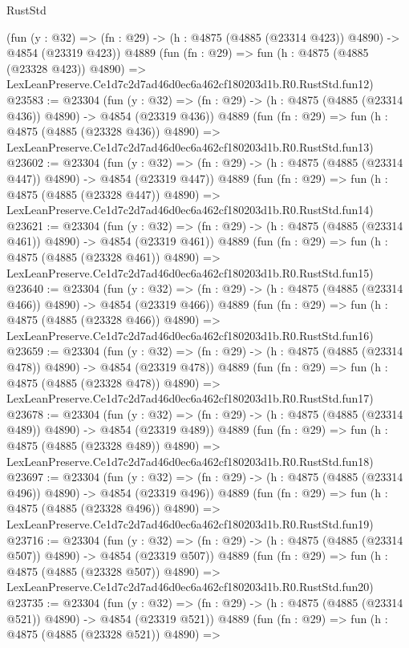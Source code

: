 \begin{lexlean}{RustStd}
\begin{coremodule}
    (fun (y : @32) => (fn : @29) -> (h : @4875 (@4885 (@23314 @423)) @4890) -> @4854 (@23319 @423))
    @4889
    (fun (fn : @29) =>
    fun (h : @4875 (@4885 (@23328 @423)) @4890) =>
    LexLeanPreserve.Ce1d7c2d7ad46d0ec6a462cf180203d1b.R0.RustStd.fun12)
@23583 := @23304
    (fun (y : @32) => (fn : @29) -> (h : @4875 (@4885 (@23314 @436)) @4890) -> @4854 (@23319 @436))
    @4889
    (fun (fn : @29) =>
    fun (h : @4875 (@4885 (@23328 @436)) @4890) =>
    LexLeanPreserve.Ce1d7c2d7ad46d0ec6a462cf180203d1b.R0.RustStd.fun13)
@23602 := @23304
    (fun (y : @32) => (fn : @29) -> (h : @4875 (@4885 (@23314 @447)) @4890) -> @4854 (@23319 @447))
    @4889
    (fun (fn : @29) =>
    fun (h : @4875 (@4885 (@23328 @447)) @4890) =>
    LexLeanPreserve.Ce1d7c2d7ad46d0ec6a462cf180203d1b.R0.RustStd.fun14)
@23621 := @23304
    (fun (y : @32) => (fn : @29) -> (h : @4875 (@4885 (@23314 @461)) @4890) -> @4854 (@23319 @461))
    @4889
    (fun (fn : @29) =>
    fun (h : @4875 (@4885 (@23328 @461)) @4890) =>
    LexLeanPreserve.Ce1d7c2d7ad46d0ec6a462cf180203d1b.R0.RustStd.fun15)
@23640 := @23304
    (fun (y : @32) => (fn : @29) -> (h : @4875 (@4885 (@23314 @466)) @4890) -> @4854 (@23319 @466))
    @4889
    (fun (fn : @29) =>
    fun (h : @4875 (@4885 (@23328 @466)) @4890) =>
    LexLeanPreserve.Ce1d7c2d7ad46d0ec6a462cf180203d1b.R0.RustStd.fun16)
@23659 := @23304
    (fun (y : @32) => (fn : @29) -> (h : @4875 (@4885 (@23314 @478)) @4890) -> @4854 (@23319 @478))
    @4889
    (fun (fn : @29) =>
    fun (h : @4875 (@4885 (@23328 @478)) @4890) =>
    LexLeanPreserve.Ce1d7c2d7ad46d0ec6a462cf180203d1b.R0.RustStd.fun17)
@23678 := @23304
    (fun (y : @32) => (fn : @29) -> (h : @4875 (@4885 (@23314 @489)) @4890) -> @4854 (@23319 @489))
    @4889
    (fun (fn : @29) =>
    fun (h : @4875 (@4885 (@23328 @489)) @4890) =>
    LexLeanPreserve.Ce1d7c2d7ad46d0ec6a462cf180203d1b.R0.RustStd.fun18)
@23697 := @23304
    (fun (y : @32) => (fn : @29) -> (h : @4875 (@4885 (@23314 @496)) @4890) -> @4854 (@23319 @496))
    @4889
    (fun (fn : @29) =>
    fun (h : @4875 (@4885 (@23328 @496)) @4890) =>
    LexLeanPreserve.Ce1d7c2d7ad46d0ec6a462cf180203d1b.R0.RustStd.fun19)
@23716 := @23304
    (fun (y : @32) => (fn : @29) -> (h : @4875 (@4885 (@23314 @507)) @4890) -> @4854 (@23319 @507))
    @4889
    (fun (fn : @29) =>
    fun (h : @4875 (@4885 (@23328 @507)) @4890) =>
    LexLeanPreserve.Ce1d7c2d7ad46d0ec6a462cf180203d1b.R0.RustStd.fun20)
@23735 := @23304
    (fun (y : @32) => (fn : @29) -> (h : @4875 (@4885 (@23314 @521)) @4890) -> @4854 (@23319 @521))
    @4889
    (fun (fn : @29) =>
    fun (h : @4875 (@4885 (@23328 @521)) @4890) =>

\end{coremodule}
\end{lexlean}
